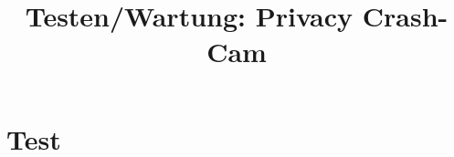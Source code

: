 \documentclass[a4paper,twoside,BCOR=20mm]{scrreprt}
\title{Testen/Wartung: Privacy Crash- Cam}
\begin{document}

\tableofcontents


\newpage

\newpage

\newpage

\newpage
\chapter{Test}

\newpage

\newpage

\newpage

\newpage

\newpage

\newpage


\end{document}
